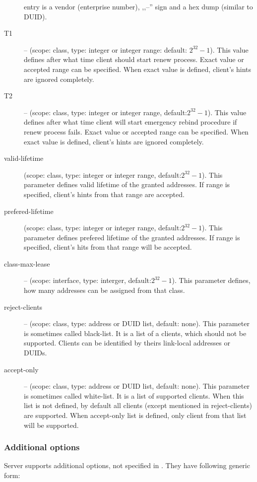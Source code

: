 \begin{description}
            entry is a vendor (enterprise number), ,,--'' sign and a
            hex dump (similar to DUID).
 \item[T1] -- (scope: class, type: integer or integer range: default:
            $2^{32}-1$). This value
	    defines after what time client should start renew
	    process. Exact value or accepted range can be
            specified. When exact value is defined, client's hints are
            ignored completely. 
 \item[T2] -- (scope: class, type: integer or integer range, default:$2^{32}-1$). This value
	    defines after what time client will start emergency rebind
	    procedure if renew process fails. Exact value or accepted range can be
            specified. When exact value is defined, client's hints are
            ignored completely.
\item[valid-lifetime] (scope: class, type: integer or integer range,
	    default:$2^{32}-1$). This parameter defines valid lifetime of
	    the granted addresses. If range is specified, client's
            hints from that range are accepted.
\item[prefered-lifetime] (scope: class, type: integer or integer range,
	    default:$2^{32}-1$). This parameter defines prefered
            lifetime of the granted addresses. If range is specified,
            client's hits from that range will be accepted.
\item[class-max-lease]  -- (scope: interface, type: interger,
            default:$2^{32}-1$). This parameter defines, how many
            addresses can be assigned from that class.
\item[reject-clients] -- (scope: class, type: address or DUID list,
            default: none). This parameter is sometimes called
            black-list. It is a list of a clients, which should not be
            supported. Clients can be identified by theirs link-local
            addresses or DUIDs.
\item[accept-only] -- (scope: class, type: address or DUID list,
            default: none). This parameter is sometimes called
            white-list. It is a list of supported clients. When this
            list is not defined, by default all clients (except
            mentioned in reject-clients) are supported. When
            accept-only list is defined, only client from that list
            will be supported.
\end{description}

\subsubsection{Additional options}
Server supports additional options, not specified in \cite{rfc3315}. They have
following generic form:

